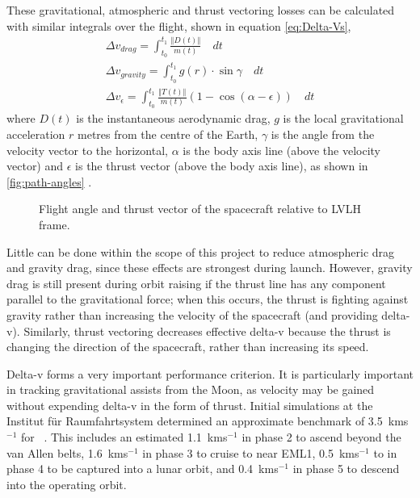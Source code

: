 These gravitational, atmospheric and thrust vectoring losses can be calculated with similar integrals over the flight, shown in equation \eqref{eq:Delta-Vs},
\begin{subequations} \label{eq:Delta-Vs}
\begin{gather}
\Delta v_{drag}=\int_{t_0}^{t_1}\frac{\left\Vert D\left(t\right)\right\Vert }{m\left(t\right)}\quad dt\label{eq:drag-penalty} \\
\Delta v_{gravity}=\int_{t_0}^{t_1}g(r)\cdot\sin\gamma\quad dt\label{eq:gravity-penalty} \\
\Delta v_\epsilon=\int_{t_0}^{t_1}\frac{\left\Vert T\left(t\right)\right\Vert }{m\left(t\right)}(1-\cos(\alpha-\epsilon))\quad dt\label{eq:thrust-vectoring-penalty}
\end{gather}
\end{subequations}
where $D(t)$ is the instantaneous aerodynamic drag, $g$ is the local gravitational acceleration $r$ metres from the centre of the Earth, $\gamma$ is the angle from the velocity vector to the horizontal, $\alpha$ is the body axis line (above the velocity vector) and $\epsilon$ is the thrust vector (above the body axis line), as shown in \autoref{fig:path-angles} \parencite{Tetlow2003}. 

\begin{figure}
\caption{Flight angle and thrust vector of the spacecraft relative to LVLH frame.} \label{fig:path-angles}
\centering
\end{figure}

Little can be done within the scope of this project to reduce atmospheric drag and gravity drag, since these effects are strongest during launch. However, gravity drag is still present during orbit raising if the thrust line has any component parallel to the gravitational force; when this occurs, the thrust is fighting against gravity rather than increasing the velocity of the spacecraft (and providing delta-v). Similarly, thrust vectoring decreases effective delta-v because the thrust is changing the direction of the spacecraft, rather than increasing its speed. 
 
Delta-v forms a very important performance criterion. It is particularly important in tracking gravitational assists from the Moon, as velocity may be gained without expending delta-v in the form of thrust. Initial simulations at the Institut f\"{u}r Raumfahrtsystem determined an approximate benchmark of 3.5~kms$^{-1}$ for \BW\ \parencite{Roeser2006}. This includes an estimated 1.1~kms$^{-1}$ in phase 2 to ascend beyond the van Allen belts, 1.6~kms$^{-1}$ in phase 3 to cruise to near EML1, 0.5~kms$^{-1}$ to in phase 4 to be captured into a lunar orbit, and 0.4~kms$^{-1}$ in phase 5 to descend into the operating orbit.

